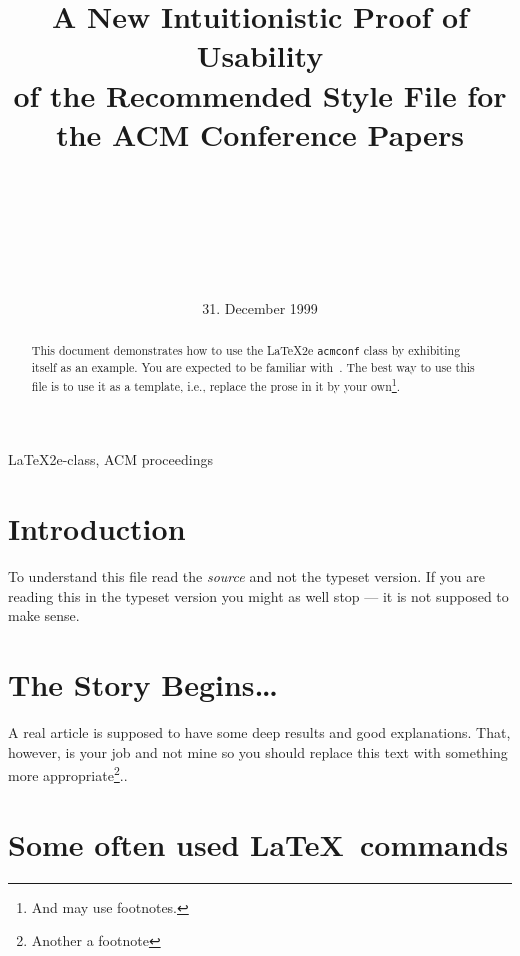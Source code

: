 \documentclass[box,accept]{acmconf}
\begin{document}
\date{31. December 1999}
\title{A New Intuitionistic Proof of Usability\\
       of the Recommended Style File for the ACM Conference Papers}
\author{\\
         \\
         \\
         \and
         \\
         \\
       }
\maketitle

\begin{abstract}
  This document demonstrates how to use the \LaTeX2e \verb|acmconf|
  class by exhibiting itself as an example.  You are expected to be
  familiar with~\cite{Lam94}.  The best way to use this file is to use
  it as a template, i.e., replace the prose in it by your
  own\footnote{And may use footnotes.}.
\end{abstract}

\begin{keywords}
\LaTeX2e-class, ACM proceedings
\end{keywords}

\section{Introduction}
To understand this file read the \emph{source} and not the typeset
version.  If you are reading this in the typeset version you might as
well stop --- it is not supposed to make sense.

\section{The Story Begins\ldots}
A real article is supposed to have some deep results and good
explanations.  That, however, is your job and not mine so you should
replace this text with something more appropriate\footnote{Another a
  footnote}..

\section{Some often used \LaTeX\ commands}
\end{document}
